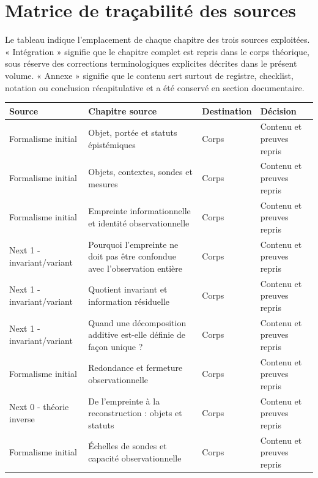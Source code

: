 \documentclass[11pt,oneside]{book}
\theoremstyle{definition}
\theoremstyle{remark}
\newcommand{\1}{\mathbf 1}
\begin{document}
\chapter{Matrice de traçabilité des sources}
Le tableau indique l'emplacement de chaque chapitre des trois sources exploitées. « Intégration » signifie que le chapitre complet est repris dans le corps théorique, sous réserve des corrections terminologiques explicites décrites dans le présent volume. « Annexe » signifie que le contenu sert surtout de registre, checklist, notation ou conclusion récapitulative et a été conservé en section documentaire.
\begin{longtable}{>{\raggedright\arraybackslash}p{} >{\raggedright\arraybackslash}p{} >{\raggedright\arraybackslash}p{} >{\raggedright\arraybackslash}p{}}
\toprule Source & Chapitre source & Destination & Décision \\
\midrule\endhead

Formalisme initial & Objet, portée et statuts épistémiques & Corps & Contenu et preuves repris \\

Formalisme initial & Objets, contextes, sondes et mesures & Corps & Contenu et preuves repris \\

Formalisme initial & Empreinte informationnelle et identité observationnelle & Corps & Contenu et preuves repris \\

Next 1 - invariant/variant & Pourquoi l'empreinte ne doit pas être confondue avec l'observation entière & Corps & Contenu et preuves repris \\

Next 1 - invariant/variant & Quotient invariant et information résiduelle & Corps & Contenu et preuves repris \\

Next 1 - invariant/variant & Quand une décomposition additive est-elle définie de façon unique ? & Corps & Contenu et preuves repris \\

Formalisme initial & Redondance et fermeture observationnelle & Corps & Contenu et preuves repris \\

Next 0 - théorie inverse & De l'empreinte à la reconstruction : objets et statuts & Corps & Contenu et preuves repris \\

Formalisme initial & Échelles de sondes et capacité observationnelle & Corps & Contenu et preuves repris \\


\end{longtable}
\end{document}
